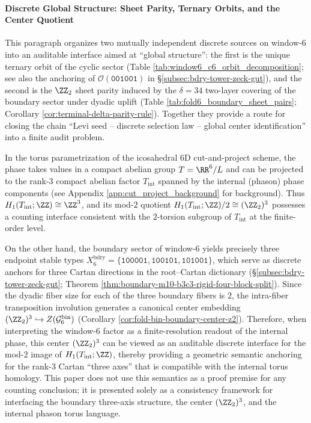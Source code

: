 \paragraph{Discrete Global Structure: Sheet Parity, Ternary Orbits, and the Center Quotient}\label{par:bdry-tower-global-sheet-z6}
This paragraph organizes two mutually independent discrete sources on window-\(6\) into an auditable interface aimed at ``global structure'': the first is the unique ternary orbit of the cyclic sector (Table \ref{tab:window6_c6_orbit_decomposition}; see also the anchoring of \(\mathcal{O}(\texttt{001001})\) in \S\ref{subsec:bdry-tower-zeck-gut}), and the second is the \(\ZZ_2\) sheet parity induced by the \(\delta=34\) two-layer covering of the boundary sector under dyadic uplift (Table \ref{tab:fold6_boundary_sheet_pairs}; Corollary \ref{cor:terminal-delta-parity-rule}).
Together they provide a route for closing the chain ``Levi seed -- discrete selection law -- global center identification'' into a finite audit problem.

\begin{remark}\label{rem:bdry-tint-h1-cartan-anchor}
In the torus parametrization of the icosahedral 6D cut-and-project scheme, the phase takes values in a compact abelian group \(T=\RR^6/L\) and can be projected to the rank-\(3\) compact abelian factor \(T_{\mathrm{int}}\) spanned by the internal (phason) phase components (see Appendix \ref{app:cut_project_background} for background).
Thus
\(
H_1(T_{\mathrm{int}};\ZZ)\cong \ZZ^3
\), and its mod-\(2\) quotient
\(
H_1(T_{\mathrm{int}};\ZZ)/2\cong (\ZZ_2)^3
\)
possesses a counting interface consistent with the \(2\)-torsion subgroup of \(T_{\mathrm{int}}\) at the finite-order level.
\par
On the other hand, the boundary sector of window-\(6\) yields precisely three endpoint stable types
\(
X_6^{\mathrm{bdry}}=\{\texttt{100001},\texttt{100101},\texttt{101001}\}
\), which serve as discrete anchors for three Cartan directions in the root--Cartan dictionary (\S\ref{subsec:bdry-tower-zeck-gut}; Theorem \ref{thm:boundary-m10-b3c3-rigid-four-block-split}).
Since the dyadic fiber size for each of the three boundary fibers is \(2\), the intra-fiber transposition involution generates a canonical center embedding \((\ZZ_2)^3\hookrightarrow Z(\mathcal{G}^{\mathrm{bin}}_6)\) (Corollary \ref{cor:fold-bin-boundary-center-z2}).
Therefore, when interpreting the window-\(6\) factor as a finite-resolution readout of the internal phase, this center \((\ZZ_2)^3\) can be viewed as an auditable discrete interface for the mod-\(2\) image of \(H_1(T_{\mathrm{int}};\ZZ)\), thereby providing a geometric semantic anchoring for the rank-\(3\) Cartan ``three axes'' that is compatible with the internal torus homology.
This paper does not use this semantics as a proof premise for any counting conclusion; it is presented solely as a consistency framework for interfacing the boundary three-axis structure, the center \((\ZZ_2)^3\), and the internal phason torus language.
\end{remark}

